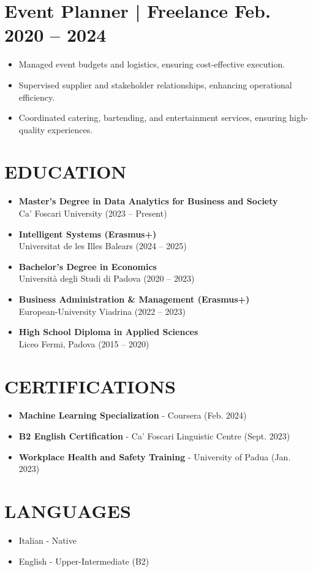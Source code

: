 \documentclass[a4paper,10pt]{article}
\newcommand{\datedsection}[2]{%
  \section*{#1 \hfill \small #2}%
}
\begin{document}
\datedsection{Event Planner | Freelance}{Feb. 2020 -- 2024}
\begin{itemize}[leftmargin=*, label={$\bullet$}]
    \item Managed event budgets and logistics, ensuring cost-effective execution.
    \item Supervised supplier and stakeholder relationships, enhancing operational efficiency.
    \item Coordinated catering, bartending, and entertainment services, ensuring high-quality experiences.
\end{itemize}

\section*{EDUCATION}
\begin{itemize}[leftmargin=*, label={$\bullet$}]
    \item \textbf{Master's Degree in Data Analytics for Business and Society} \\
          Ca' Foscari University (2023 -- Present)
    \item \textbf{Intelligent Systems (Erasmus+)} \\
          Universitat de les Illes Balears (2024 -- 2025)
    \item \textbf{Bachelor's Degree in Economics} \\
          Università degli Studi di Padova (2020 -- 2023)
    \item \textbf{Business Administration \& Management (Erasmus+)} \\
          European-University Viadrina (2022 -- 2023)
    \item \textbf{High School Diploma in Applied Sciences} \\
          Liceo Fermi, Padova (2015 -- 2020)
\end{itemize}

\section*{CERTIFICATIONS}
\begin{itemize}[leftmargin=*, label={$\bullet$}]
    \item \textbf{Machine Learning Specialization} - Coursera (Feb. 2024)
    \item \textbf{B2 English Certification} - Ca' Foscari Linguistic Centre (Sept. 2023)
    \item \textbf{Workplace Health and Safety Training} - University of Padua (Jan. 2023)
\end{itemize}

\section*{LANGUAGES}
\begin{itemize}[leftmargin=*, label={$\bullet$}]
    \item Italian - Native
    \item English - Upper-Intermediate (B2)
\end{itemize}
\end{document}
